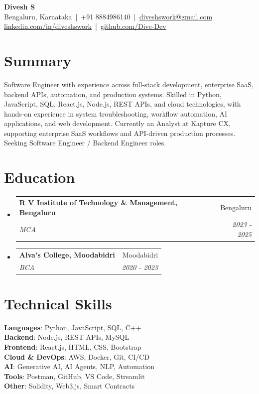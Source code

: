 \documentclass[a4paper,9pt]{article}
\makeatletter
\newcommand{\resumeSubheading}[4]{
  \vspace{-1pt}\item
    \begin{tabular*}{0.98\textwidth}[t]{l@{\extracolsep{\fill}}r}
      \textbf{#1} & #2 \\
      \textit{\small#3} & \textit{\small #4} \\
    \end{tabular*}\vspace{-5pt}
}
\newcommand{\resumeSubHeadingListStart}{\begin{itemize}[leftmargin=0.15in, label={}]}
\newcommand{\resumeSubHeadingListEnd}{\end{itemize}}
\makeatother
\begin{document}
\begin{center}
    {\Large \textbf{Divesh S}}\\[-1pt]
    Bengaluru, Karnataka \,|\, +91 8884986140 \,|\,
    \href{mailto:diveshswork@gmail.com}{diveshswork@gmail.com}\\[-1pt]
    \href{https://linkedin.com/in/diveshswork}{linkedin.com/in/diveshswork}
    \,|\, 
    \href{https://github.com/Dive-Dev}{github.com/Dive-Dev}
    
\end{center}

\section{Summary}
  \small{Software Engineer with experience across full-stack development, enterprise SaaS, backend APIs, automation, and production systems. Skilled in Python, JavaScript, SQL, React.js, Node.js, REST APIs, and cloud technologies, with hands-on experience in system troubleshooting, workflow automation, AI applications, and web development. Currently an Analyst at Kapture CX, supporting enterprise SaaS workflows and API-driven production processes. Seeking Software Engineer / Backend Engineer roles.}


\section{Education}
  \resumeSubHeadingListStart
    \resumeSubheading
      {R V Institute of Technology \& Management, Bengaluru}{Bengaluru}
      {MCA}{2023 - 2025}
    \resumeSubheading
      {Alva's College, Moodabidri}{Moodabidri}
      {BCA}{2020 - 2023}
  \resumeSubHeadingListEnd

\section{Technical Skills}
 \begin{itemize}[leftmargin=0.15in, label={}]
    \small{\item{
     \textbf{Languages}{: Python, JavaScript, SQL, C++} \\
     \textbf{Backend}{: Node.js, REST APIs, MySQL} \\
     \textbf{Frontend}{: React.js, HTML, CSS, Bootstrap} \\
     \textbf{Cloud \& DevOps}{: AWS, Docker, Git, CI/CD} \\
     \textbf{AI}{: Generative AI, AI Agents, NLP, Automation} \\
     \textbf{Tools}{: Postman, GitHub, VS Code, Streamlit} \\
     \textbf{Other}{: Solidity, Web3.js, Smart Contracts} \\
    }}
 \end{itemize}
\end{document}
